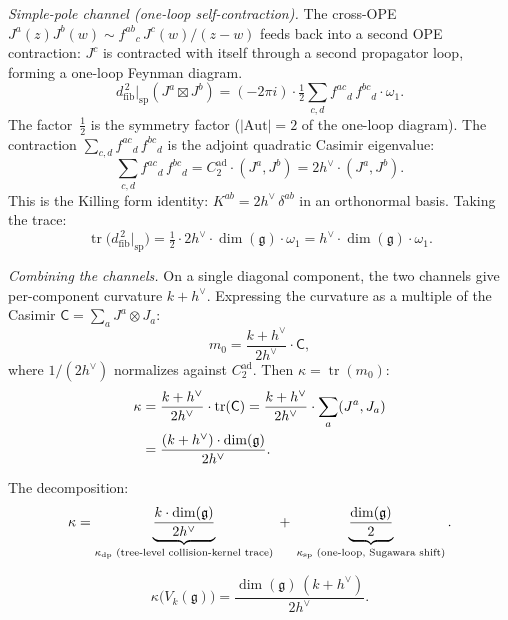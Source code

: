 \documentclass[11pt,reqno]{amsart}
\theoremstyle{definition}
\theoremstyle{remark}
\newcommand{\fg}{\mathfrak{g}}
\newcommand{\Aut}{\mathrm{Aut}}
\newcommand{\dfib}{d_{\mathrm{fib}}}
\DeclareMathOperator{\tr}{tr}
\numberwithin{equation}{section}
\begin{document}
\medskip\noindent
\emph{Simple-pole channel (one-loop self-contraction).}
The cross-OPE $J^a(z)J^b(w) \sim f^{ab}{}_c\,J^c(w)/(z-w)$
feeds back into a second OPE contraction: $J^c$ is
contracted with itself through a second propagator loop,
forming a one-loop Feynman diagram.
\begin{equation}\label{eq:sp-channel}
\dfib^{\,2}\big|_{\mathrm{sp}}(J^a \boxtimes J^b)
= (-2\pi i)\cdot\tfrac{1}{2}\sum_{c,d}
 f^{ac}{}_d\,f^{bc}{}_d\cdot\omega_1.
\end{equation}
The factor~$\frac{1}{2}$ is the symmetry factor
($|\Aut| = 2$ of the one-loop diagram). The contraction
$\sum_{c,d}f^{ac}{}_d\,f^{bc}{}_d$ is the adjoint
quadratic Casimir eigenvalue:
\begin{equation}\label{eq:casimir-adj}
\sum_{c,d}f^{ac}{}_d\,f^{bc}{}_d
= C_2^{\mathrm{ad}}\cdot(J^a,J^b) = 2h^\vee\cdot(J^a,J^b).
\end{equation}
This is the Killing form identity: $K^{ab} = 2h^\vee\,
\delta^{ab}$ in an orthonormal basis. Taking the trace:
\begin{equation}\label{eq:sp-trace}
\tr\bigl(\dfib^{\,2}\big|_{\mathrm{sp}}\bigr)
= \tfrac{1}{2}\cdot 2h^\vee\cdot\dim(\fg)\cdot\omega_1
= h^\vee\cdot\dim(\fg)\cdot\omega_1.
\end{equation}

\medskip\noindent
\emph{Combining the channels.}
On a single diagonal component, the two channels give
per-component curvature $k + h^\vee$. Expressing the
curvature as a multiple of the Casimir
$\mathsf{C} = \sum_a J^a\otimes J_a$:
\[
m_0 = \frac{k+h^\vee}{2h^\vee}\cdot\mathsf{C},
\]
where $1/(2h^\vee)$ normalizes against $C_2^{\mathrm{ad}}$.
Then $\kappa = \tr(m_0)$:
\begin{align}
\kappa &= \frac{k+h^\vee}{2h^\vee}\cdot\tr(\mathsf{C})
= \frac{k+h^\vee}{2h^\vee}\cdot\sum_a(J^a,J_a)
\notag\\
&= \frac{(k+h^\vee)\cdot\dim(\fg)}{2h^\vee}.
\label{eq:kappa-km-derivation}
\end{align}

The decomposition:
\begin{equation}\label{eq:dp-sp-decomposition}
\kappa = \underbrace{\frac{k\cdot\dim(\fg)}{2h^\vee}}_{%
 \kappa_{\mathrm{dp}}\text{ (tree-level collision-kernel trace)}}
\;+\;
\underbrace{\frac{\dim(\fg)}{2}}_{%
 \kappa_{\mathrm{sp}}\text{ (one-loop, Sugawara shift)}}.
\end{equation}

\begin{equation}\label{eq:kappa-km}
\boxed{\;\kappa\bigl(V_k(\fg)\bigr)
= \frac{\dim(\fg)\,(k + h^\vee)}{2h^\vee}.\;}
\end{equation}
\end{document}
